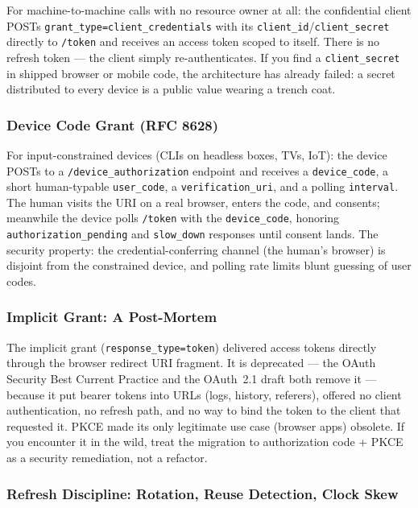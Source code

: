 For machine-to-machine calls with no resource owner at all: the confidential
client POSTs \texttt{grant\_type=client\_credentials} with its
\texttt{client\_id}/\texttt{client\_secret} directly to \texttt{/token} and
receives an access token scoped to itself. There is no refresh token ---
the client simply re-authenticates. If you find a \texttt{client\_secret}
in shipped browser or mobile code, the architecture has already failed: a
secret distributed to every device is a public value wearing a trench coat.

\subsubsection{Device Code Grant (RFC 8628)}

For input-constrained devices (CLIs on headless boxes, TVs, IoT): the device
POSTs to a \texttt{/device\_authorization} endpoint and receives a
\texttt{device\_code}, a short human-typable \texttt{user\_code}, a
\texttt{verification\_uri}, and a polling \texttt{interval}. The human
visits the URI on a real browser, enters the code, and consents; meanwhile
the device polls \texttt{/token} with the \texttt{device\_code}, honoring
\texttt{authorization\_pending} and \texttt{slow\_down} responses until
consent lands. The security property: the credential-conferring channel
(the human's browser) is disjoint from the constrained device, and polling
rate limits blunt guessing of user codes.

\subsubsection{Implicit Grant: A Post-Mortem}

The implicit grant (\texttt{response\_type=token}) delivered access tokens
directly through the browser redirect URI fragment. It is deprecated --- the
OAuth Security Best Current Practice and the OAuth~2.1 draft both remove it
--- because it put bearer tokens into URLs (logs, history, referers),
offered no client authentication, no refresh path, and no way to bind the
token to the client that requested it. PKCE made its only legitimate use
case (browser apps) obsolete. If you encounter it in the wild, treat the
migration to authorization code + PKCE as a security remediation, not a
refactor.

\subsubsection{Refresh Discipline: Rotation, Reuse Detection, Clock Skew}

